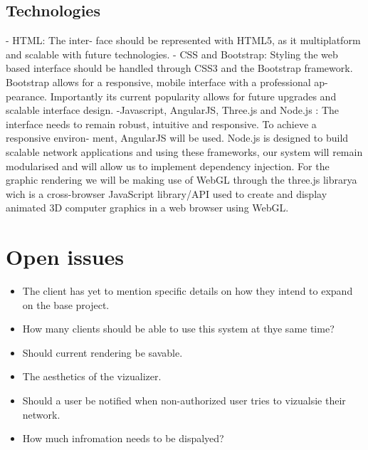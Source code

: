 \documentclass[a4paper,12pt]{report}
\begin{document}
	\subsection{Technologies}
- HTML: The inter-
face should be represented with HTML5, as it multiplatform and
scalable with future technologies.
- CSS and Bootstrap: Styling the web based interface should be
handled through CSS3 and the Bootstrap framework. Bootstrap
allows for a responsive, mobile interface with a professional ap-
pearance. Importantly its current popularity allows for future
upgrades and scalable interface design.
-Javascript, AngularJS, Three.js and Node.js : The interface needs to remain
robust, intuitive and responsive. To achieve a responsive environ-
ment, AngularJS will be used. Node.js is designed to build scalable
network applications and using these frameworks, our system will
remain modularised and will allow us to implement dependency
injection. For the graphic rendering we will be making use of WebGL through the three.js librarya wich is a cross-browser JavaScript library/API used to create and display animated 3D computer graphics in a web browser using WebGL. 

\section{Open issues}
	\begin{itemize}
		\item The client has yet to mention specific details on how they intend to expand on the base project.
	\end{itemize}
	\begin{itemize}
		\item How many clients should be able to use this system at thye same time?
	\end{itemize}
	\begin{itemize}
		\item Should current rendering be savable. 
	\end{itemize}
	\begin{itemize}
		\item The aesthetics of the vizualizer.
	\end{itemize}
	\begin{itemize}
		\item Should a user be notified when non-authorized user tries to vizualsie their network.
	\end{itemize}
	\begin{itemize}
		\item How much infromation needs to be dispalyed?
	\end{itemize}
\end{document}
